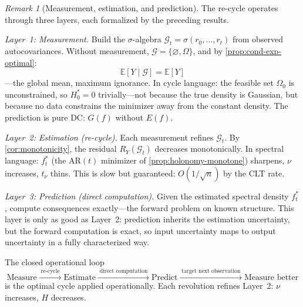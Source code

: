 \documentclass[12pt]{amsart}
\theoremstyle{definition}
\theoremstyle{remark}
\newtheorem*{remark}{Remark}
\begin{document}
\begin{remark}[Measurement, estimation, and prediction]\label{rem:three-layers}
The re-cycle operates through three layers, each formalized by the preceding results.

\emph{Layer~1: Measurement.}
Build the $\sigma$-algebra $\mathcal{G}_t = \sigma(r_0, \ldots, r_t)$ from observed autocovariances. Without measurement, $\mathcal{G} = \{\varnothing, \Omega\}$, and by \cref{prop:cond-exp-optimal}:
\[
\mathbb{E}[Y \mid \mathcal{G}] = \mathbb{E}[Y]
\]
---the global mean, maximum ignorance. In cycle language: the feasible set $\Omega_0$ is unconstrained, so $H_0^* = 0$ trivially---not because the true density is Gaussian, but because no data constrains the minimizer away from the constant density. The prediction is pure DC: $G(f)$ without $E(f)$.

\emph{Layer~2: Estimation (re-cycle).}
Each measurement refines $\mathcal{G}_t$. By \cref{cor:monotonicity}, the residual $R_Y(\mathcal{G}_t)$ decreases monotonically. In spectral language: $f_t^*$ (the AR$(t)$ minimizer of \cref{prop:holonomy-monotone}) sharpens, $\nu$ increases, $t_\nu$ thins. This is slow but guaranteed: $O(1/\sqrt{n})$ by the CLT rate.

\emph{Layer~3: Prediction (direct computation).}
Given the estimated spectral density $f_t^*$, compute consequences exactly---the forward problem on known structure. This layer is only as good as Layer~2: prediction inherits the estimation uncertainty, but the forward computation is exact, so input uncertainty maps to output uncertainty in a fully characterized way.

The closed operational loop
\[
\text{Measure}
\xrightarrow{\;\text{re-cycle}\;}
\text{Estimate}
\xrightarrow{\;\text{direct computation}\;}
\text{Predict}
\xrightarrow{\;\text{target next observation}\;}
\text{Measure better}
\]
is the optimal cycle applied operationally. Each revolution refines Layer~2: $\nu$ increases, $H$ decreases.
\end{remark}
\end{document}

